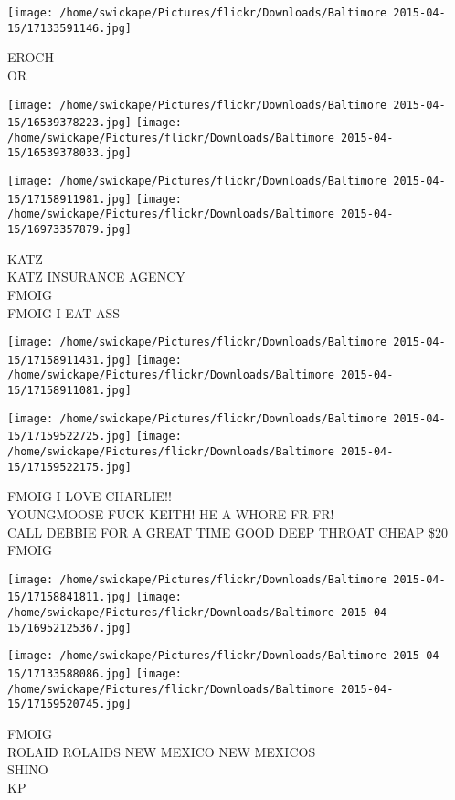 \documentclass[10pt,letterpaper]{article}
\begin{document}
\vspace{0.25in}
\texttt{[image: /home/swickape/Pictures/flickr/Downloads/Baltimore 2015-04-15/17133591146.jpg]}

EROCH\\
OR
\pagebreak

\texttt{[image: /home/swickape/Pictures/flickr/Downloads/Baltimore 2015-04-15/16539378223.jpg]}
\texttt{[image: /home/swickape/Pictures/flickr/Downloads/Baltimore 2015-04-15/16539378033.jpg]}

\texttt{[image: /home/swickape/Pictures/flickr/Downloads/Baltimore 2015-04-15/17158911981.jpg]}
\texttt{[image: /home/swickape/Pictures/flickr/Downloads/Baltimore 2015-04-15/16973357879.jpg]}

KATZ\\
KATZ INSURANCE AGENCY\\
FMOIG\\
FMOIG I EAT ASS
\pagebreak

\texttt{[image: /home/swickape/Pictures/flickr/Downloads/Baltimore 2015-04-15/17158911431.jpg]}
\texttt{[image: /home/swickape/Pictures/flickr/Downloads/Baltimore 2015-04-15/17158911081.jpg]}

\texttt{[image: /home/swickape/Pictures/flickr/Downloads/Baltimore 2015-04-15/17159522725.jpg]}
\texttt{[image: /home/swickape/Pictures/flickr/Downloads/Baltimore 2015-04-15/17159522175.jpg]}

FMOIG I LOVE CHARLIE!!\\
YOUNGMOOSE FUCK KEITH! HE A WHORE FR FR!\\
CALL DEBBIE FOR A GREAT TIME GOOD DEEP THROAT CHEAP \$20\\
FMOIG
\pagebreak

\texttt{[image: /home/swickape/Pictures/flickr/Downloads/Baltimore 2015-04-15/17158841811.jpg]}
\texttt{[image: /home/swickape/Pictures/flickr/Downloads/Baltimore 2015-04-15/16952125367.jpg]}

\texttt{[image: /home/swickape/Pictures/flickr/Downloads/Baltimore 2015-04-15/17133588086.jpg]}
\texttt{[image: /home/swickape/Pictures/flickr/Downloads/Baltimore 2015-04-15/17159520745.jpg]}

FMOIG\\
ROLAID ROLAIDS NEW MEXICO NEW MEXICOS\\
SHINO\\
KP
\pagebreak
\end{document}
